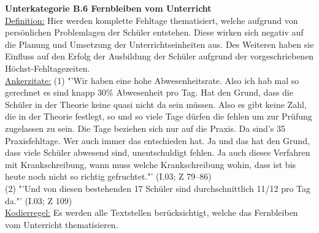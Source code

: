 \noindent
\textbf{Unterkategorie B.6 Fernbleiben vom Unterricht}\\
\underline{Definition:} Hier werden komplette Fehltage thematisiert, welche aufgrund von persönlichen Problemlagen der Schüler entstehen. Diese wirken sich negativ auf die Planung und Umsetzung der Unterrichtseinheiten aus. Des Weiteren haben sie Einfluss auf den Erfolg der Ausbildung der Schüler aufgrund der vorgeschriebenen Höchst-Fehltagezeiten.\\
\underline{Ankerzitate:} (1) "'Wir haben eine hohe Abwesenheitsrate. Also ich hab mal so gerechnet es sind knapp 30\% Abwesenheit pro Tag. Hat den Grund, dass die Schüler in der Theorie keine quasi nicht da sein müssen. Also es gibt keine Zahl, die in der Theorie festlegt, so und so viele Tage dürfen die fehlen um zur Prüfung zugelassen zu sein. Die Tage beziehen sich nur auf die Praxis. Da sind's 35 Praxisfehltage. Wer auch immer das entschieden hat. Ja und das hat den Grund, dass viele Schüler abwesend sind, unentschuldigt fehlen. Ja auch dieses Verfahren mit Krankschreibung, wann muss welche Krankschreibung wohin, dass ist bis heute noch nicht so richtig gefruchtet."' (I.03; Z 79--86)\\ (2) "'Und von diesen bestehenden 17 Schüler sind durchschnittlich 11/12 pro Tag da."' (I.03; Z 109)\\
\underline{Kodierregel:} Es werden alle Textstellen berücksichtigt, welche das Fernbleiben vom Unterricht thematisieren.\\

